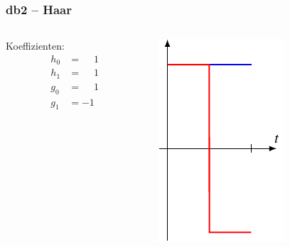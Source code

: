 %
%
\begin{frame}
\frametitle{db2 -- Haar}
\begin{columns}[T]
\begin{column}{2.5cm}
Koeffizienten:
\[
\begin{aligned}
h_0&=\phantom{-}1\\
h_1&=\phantom{-}1\\[10pt]
g_0&=\phantom{-}1\\
g_1&=-1\\
\end{aligned}
\]
\end{column}
\begin{column}{9.5cm}
\includegraphics{../../buch/chapters/7-algo/images/db1.pdf}
\end{column}
\end{columns}
\end{frame}


